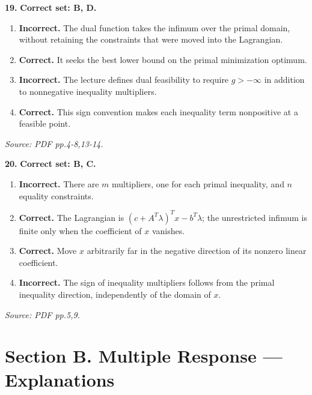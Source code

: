 \documentclass[11pt,a4paper]{article}
\begin{document}
\par\noindent\begin{minipage}{\linewidth}
\textbf{19.} \textbf{Correct set: B, D.}
\begin{enumerate}[label=(\Alph*),leftmargin=8mm,itemsep=2pt,topsep=2pt]
\item \textbf{Incorrect.} The dual function takes the infimum over the primal domain, without retaining the constraints that were moved into the Lagrangian.
\item \textbf{Correct.} It seeks the best lower bound on the primal minimization optimum.
\item \textbf{Incorrect.} The lecture defines dual feasibility to require \(g> -\infty\) in addition to nonnegative inequality multipliers.
\item \textbf{Correct.} This sign convention makes each inequality term nonpositive at a feasible point.
\end{enumerate}
{\footnotesize\textit{Source: PDF pp.4-8,13-14.}}

\end{minipage}\par\vspace{3mm}
\par\noindent\begin{minipage}{\linewidth}
\textbf{20.} \textbf{Correct set: B, C.}
\begin{enumerate}[label=(\Alph*),leftmargin=8mm,itemsep=2pt,topsep=2pt]
\item \textbf{Incorrect.} There are \(m\) multipliers, one for each primal inequality, and \(n\) equality constraints.
\item \textbf{Correct.} The Lagrangian is \((c+A^T\lambda)^Tx-b^T\lambda\); the unrestricted infimum is finite only when the coefficient of \(x\) vanishes.
\item \textbf{Correct.} Move \(x\) arbitrarily far in the negative direction of its nonzero linear coefficient.
\item \textbf{Incorrect.} The sign of inequality multipliers follows from the primal inequality direction, independently of the domain of \(x\).
\end{enumerate}
{\footnotesize\textit{Source: PDF pp.5,9.}}

\end{minipage}\par\vspace{3mm}
\newpage\section*{Section B. Multiple Response --- Explanations}
\end{document}
